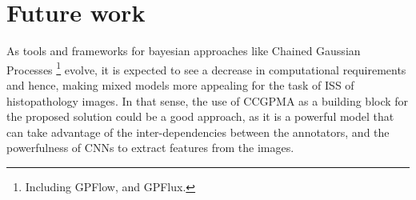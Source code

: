\section{Future work}

As tools and frameworks for bayesian approaches like Chained Gaussian Processes
\footnote{Including GPFlow, and GPFlux.}
evolve, it is expected to see a decrease in computational
requirements and hence, making mixed models more appealing for the
task of \gls{ISS} of histopathology images.
In that sense, the use of \gls{CCGPMA} as a building block for the
proposed solution could be a good approach, as it is a powerful model
that can take advantage of the inter-dependencies between the annotators,
and the powerfulness of \glspl{CNN} to extract features from the images.
